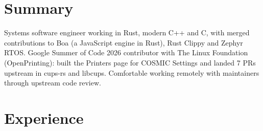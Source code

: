 \documentclass[10pt]{article}
\begin{document}

\section*{Summary}
Systems software engineer working in Rust, modern C++ and C, with merged contributions to Boa (a JavaScript engine in Rust), Rust Clippy and Zephyr RTOS. Google Summer of Code 2026 contributor with The Linux Foundation (OpenPrinting): built the Printers page for COSMIC Settings and landed 7 PRs upstream in cups-rs and libcups. Comfortable working remotely with maintainers through upstream code review.

\section*{Experience}
\end{document}
